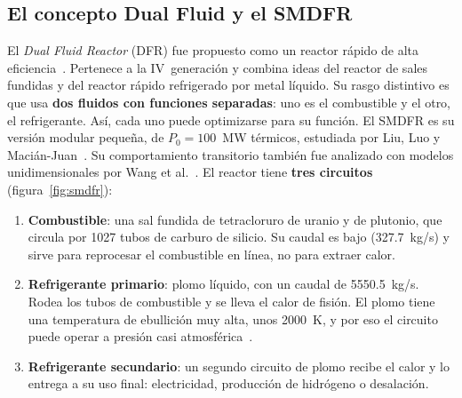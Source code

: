 \subsection{El concepto Dual Fluid y el SMDFR}
El \emph{Dual Fluid Reactor} (DFR) fue propuesto como un reactor rápido de alta
eficiencia~\cite{huke2015}. Pertenece a la IV~generación y combina ideas del reactor de sales
fundidas y del reactor rápido refrigerado por metal líquido. Su rasgo distintivo es que usa
\textbf{dos fluidos con funciones separadas}: uno es el combustible y el otro, el
refrigerante. Así, cada uno puede optimizarse para su función. El SMDFR es su versión modular
pequeña, de $P_0=100$~MW térmicos, estudiada por Liu, Luo y Macián-Juan~\cite{liu2021}. Su
comportamiento transitorio también fue analizado con modelos unidimensionales por Wang et
al.~\cite{wang2021}. El reactor tiene \textbf{tres circuitos} (figura~\ref{fig:smdfr}):
\begin{enumerate}
  \item \textbf{Combustible}: una sal fundida de tetracloruro de uranio y de plutonio, que
        circula por 1027 tubos de carburo de silicio. Su caudal es bajo (327.7~kg/s) y sirve
        para reprocesar el combustible en línea, no para extraer calor.
  \item \textbf{Refrigerante primario}: plomo líquido, con un caudal de 5550.5~kg/s. Rodea
        los tubos de combustible y se lleva el calor de fisión. El plomo tiene una
        temperatura de ebullición muy alta, unos 2000~K, y por eso el circuito puede operar a
        presión casi atmosférica~\cite{oecd2015}.
  \item \textbf{Refrigerante secundario}: un segundo circuito de plomo recibe el calor y lo
        entrega a su uso final: electricidad, producción de hidrógeno o desalación.
\end{enumerate}

